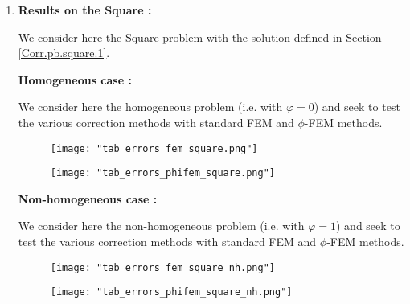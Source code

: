 \begin{enumerate}[label=\textbullet]
	\item \textbf{Results on the Square :}
	
	We consider here the Square problem with the solution defined in Section \ref{Corr.pb.square.1}.
	
	\textbf{Homogeneous case :}
	
	We consider here the homogeneous problem (i.e. with $\varphi=0$) and seek to test the various correction methods with standard FEM and $\phi$-FEM methods.
	
	\begin{minipage}{0.48\linewidth}
		\begin{figure}[H]
			\centering
			\texttt{[image: "tab\_errors\_fem\_square.png"]}
			\label{tab_errors_fem_square}
		\end{figure} 
	\end{minipage}
	\begin{minipage}{0.48\linewidth} \qquad 
		\begin{figure}[H]
			\centering
			\texttt{[image: "tab\_errors\_phifem\_square.png"]}
			\label{tab_errors_phifem_square}
		\end{figure} 
	\end{minipage}
	
	\textbf{Non-homogeneous case :}
	
	We consider here the non-homogeneous problem (i.e. with $\varphi=1$) and seek to test the various correction methods with standard FEM and $\phi$-FEM methods.
	
	\begin{minipage}{0.48\linewidth}
		\begin{figure}[H]
			\centering
			\texttt{[image: "tab\_errors\_fem\_square\_nh.png"]}
			\label{tab_errors_fem_square_nh}
		\end{figure} 
	\end{minipage}
	\begin{minipage}{0.48\linewidth} \qquad 
		\begin{figure}[H]
			\centering
			\texttt{[image: "tab\_errors\_phifem\_square\_nh.png"]}
			\label{tab_errors_phifem_square_nh}
		\end{figure} 
	\end{minipage}
\end{enumerate}

